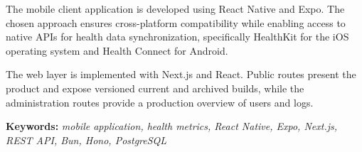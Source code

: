 The mobile client application is developed using React Native and Expo. The chosen approach ensures cross-platform compatibility while enabling access to native APIs for health data synchronization, specifically HealthKit for the iOS operating system and Health Connect for Android.

The web layer is implemented with Next.js and React. Public routes present the product and expose versioned current and archived builds, while the administration routes provide a production overview of users and logs.

\bigskip
\noindent\textbf{Keywords:}
\textit{mobile application, health metrics, React Native, Expo, Next.js, REST API, Bun, Hono, PostgreSQL}
